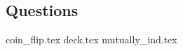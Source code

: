 \documentclass{exam}
\begin{document}
\subsection{Questions}
\begin{questions}
{coin_flip.tex}
{deck.tex}
{mutually_ind.tex}
\end{questions}

\end{document}
